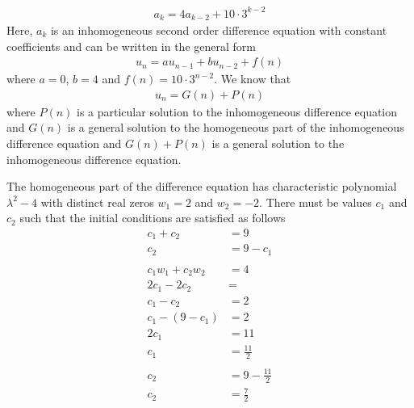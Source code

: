 \documentclass[10pt]{article}
\begin{document}
\begin{enumerate}
\begin{enumerate}
                \begin{align*}
                    a_k = 4a_{k - 2} + 10 \cdot 3^{k - 2}
                \end{align*}
                Here, $a_k$ is an inhomogeneous second order difference
                equation with constant coefficients and can be written in the
                general form
                \begin{align*}
                    u_n = au_{n - 1} + bu_{n - 2} + f(n)
                \end{align*}
                where $a = 0$, $b = 4$ and $f(n) = 10 \cdot 3^{n - 2}$.
                We know that
                \begin{align*}
                    u_n = G(n) + P(n)
                \end{align*}
                where $P(n)$ is a particular solution to the inhomogeneous
                difference equation and $G(n)$ is a general solution to the
                homogeneous part of the inhomogeneous difference equation and
                $G(n) + P(n)$ is a general solution to the inhomogeneous
                difference equation.

                The homogeneous part of the difference equation has
                characteristic polynomial $\lambda^2 - 4$ with distinct
                real zeros $w_1 = 2$ and $w_2 = -2$. There must be values $c_1$
                and $c_2$ such that the initial conditions are satisfied as
                follows
                \begin{align*}
                    c_1 + c_2 &= 9 \\
                    c_2 &= 9 - c_1 \\
                    \\
                    c_1w_1 + c_2w_2 &= 4 \\
                    2c_1 - 2c_2 &= \\
                    c_1 - c_2 &= 2\\
                    c_1 - (9 - c_1) &= 2\\
                    2c_1 &= 11\\
                    c_1 &= \tfrac{11}{2} \\
                    \\
                    c_2 &= 9 - \tfrac{11}{2} \\
                    c_2 &= \tfrac{7}{2} \\
                \end{align*}


\end{enumerate}
\end{enumerate}
\end{document}
